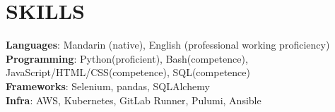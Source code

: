 \documentclass[letterpaper,11pt]{article}
\begin{document}
%
\section{SKILLS}
 \begin{itemize}[leftmargin=0in, label={}]
    \small{\item{
     \textbf{Languages}{: Mandarin (native), English (professional working proficiency)}\vspace{2pt} \\
     \textbf{Programming}{: Python(proficient), Bash(competence), JavaScript/HTML/CSS(competence), SQL(competence)}\vspace{2pt} \\
     \textbf{Frameworks}{: Selenium, pandas, SQLAlchemy} \\
     \textbf{Infra}{: AWS, Kubernetes, GitLab Runner, Pulumi, Ansible}
    }}
 \end{itemize}


\end{document}
